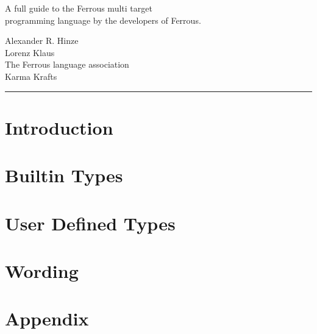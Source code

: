 \documentclass[11pt]{article}
\begin{document}
\begin{titlepage}
{{{{                        \vspace{0.7cm} %
                    }
                }
            }
        }
        \setlength{\fboxrule}{1pt}

        \begin{center}
            \fontsize{16}{0} \selectfont
            A full guide to the Ferrous multi target\\
            programming language by the developers of Ferrous.
            \normalfont \selectfont
        \end{center}

        \vfill %

        \parbox[t]{0.93 \textwidth}{ %
            \raggedleft %
            \large %
            {\Large Alexander R. Hinze}\\[4pt] %
            {\Large Lorenz Klaus}\\[4pt] %
            The Ferrous language association\\
            Karma Krafts

            \hfill \rule {0.2 \linewidth}{1pt} %
        }
    \end{titlepage}

    \tableofcontents \newpage


    \section{Introduction} \label{sec:introduction}
    
    \newpage


    \section{Builtin Types} \label{sec:builtin-types}
    
    \newpage


    \section{User Defined Types} \label{sec:user-defined-types}
    
    \newpage


    \section{Wording} \label{sec:wording}
    
    \newpage


    \section{Appendix} \label{sec:appendix}
    
\end{document}
